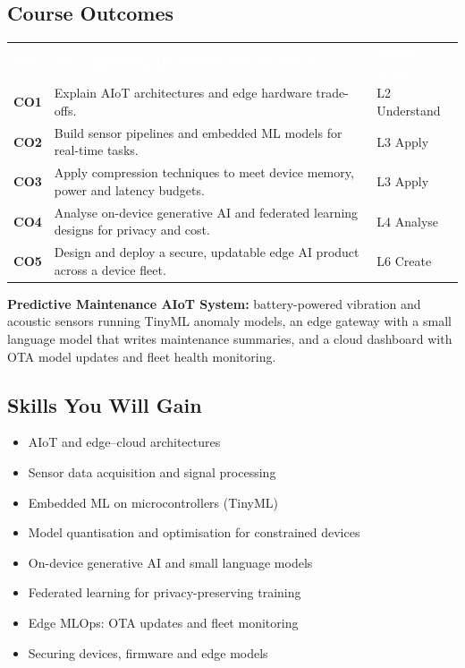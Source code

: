 \documentclass[10pt,a4paper]{article}
\newcommand{\hdr}{\rowcolor{navy}}
\newcommand{\hw}[1]{\textcolor{white}{\bfseries #1}}
\begin{document}
\subsection*{Course Outcomes}
\par{\small\begin{tabularx}{\linewidth}{@{}>{\bfseries}p{0.9cm}Y>{\raggedright\arraybackslash}p{2.3cm}@{}}\hdr\hw{CO}&\hw{On completion, the learner will be able to}&\hw{Bloom Level}\\
CO1 & Explain AIoT architectures and edge hardware trade-offs. & L2 Understand\\
CO2 & Build sensor pipelines and embedded ML models for real-time tasks. & L3 Apply\\
CO3 & Apply compression techniques to meet device memory, power and latency budgets. & L3 Apply\\
CO4 & Analyse on-device generative AI and federated learning designs for privacy and cost. & L4 Analyse\\
CO5 & Design and deploy a secure, updatable edge AI product across a device fleet. & L6 Create\\
\bottomrule\end{tabularx}}
\begin{tcolorbox}[colback=goldbg,colframe=goldl,boxrule=0.7pt,arc=2pt,title={Enterprise Capstone Product},colbacktitle=goldl!35,coltitle=navy,fonttitle=\small\bfseries]\small\textbf{Predictive Maintenance AIoT System:} battery-powered vibration and acoustic sensors running TinyML anomaly models, an edge gateway with a small language model that writes maintenance summaries, and a cloud dashboard with OTA model updates and fleet health monitoring.\end{tcolorbox}
\subsection*{Skills You Will Gain}\begin{multicols}{2}\begin{itemize}\small
\item AIoT and edge–cloud architectures
\item Sensor data acquisition and signal processing
\item Embedded ML on microcontrollers (TinyML)
\item Model quantisation and optimisation for constrained devices
\item On-device generative AI and small language models
\item Federated learning for privacy-preserving training
\item Edge MLOps: OTA updates and fleet monitoring
\item Securing devices, firmware and edge models
\end{itemize}\end{multicols}
\end{document}
